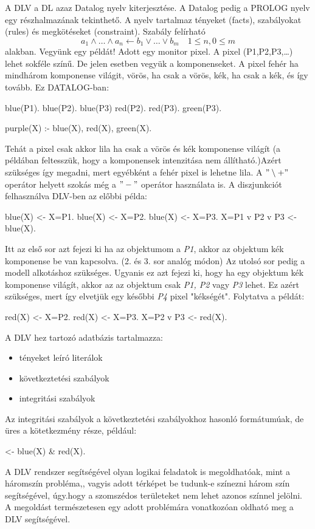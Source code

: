 A DLV a DL azaz Datalog nyelv kiterjesztése. A Datalog pedig a PROLOG nyelv egy részhalmazának tekinthető. A nyelv tartalmaz tényeket (facts), szabályokat (rules) és megkötéseket (constraint). Szabály felírható $$a_1 \wedge \ldots \wedge a_n \leftarrow b_1\vee \ldots \vee b_m \quad 1\leq n, 0\leq m$$ alakban. 
Vegyünk egy  példát! Adott egy monitor pixel. A pixel (P1,P2,P3,\ldots) lehet sokféle színű. De jelen esetben vegyük a komponenseket. A pixel fehér ha mindhárom komponense világit, vörös, ha csak a vörös, kék, ha csak a kék, és így tovább.  
Ez DATALOG-ban:
\begin{cpp}
blue(P1).
blue(P2).
blue(P3)
red(P2).
red(P3).
green(P3).

purple(X) :- blue(X), red(X), \+ green(X).
\end{cpp}
Tehát a pixel csak akkor lila ha csak a vörös és kék komponense világít (a példában feltesszük, hogy a komponensek intenzitása nem állítható.)Azért szükséges így megadni, mert egyébként a fehér pixel is lehetne lila. A $"\setminus+"$ operátor helyett szokás még a $"-"$ operátor használata is.
A diszjunkciót felhasználva DLV-ben az előbbi példa:
\begin{cpp}
blue(X) <- X=P1.
blue(X) <- X=P2.
blue(X) <- X=P3.
X=P1 v P2 v P3 <-blue(X).
\end{cpp}
Itt az első sor azt fejezi ki ha az objektumom a \textsl{P1}, akkor az objektum kék komponense be van kapcsolva. (2. és 3. sor analóg módon) Az utolsó sor pedig a modell alkotáshoz szükséges. Ugyanis ez azt fejezi ki, hogy ha egy objektum kék komponense világít, akkor az az objektum csak \textit{P1, P2} vagy \textit{P3} lehet. Ez azért szükséges, mert így elvetjük egy későbbi \textsl{P4} pixel "kékségét".
Folytatva a példát:
\begin{cpp}
red(X) <- X=P2.
red(X) <- X=P3.
X=P2 v P3 <- red(X).
\end{cpp}
A DLV hez tartozó adatbázis tartalmazza:
\begin{itemize}
\item tényeket leíró literálok
\item következtetési szabályok
\item integritási szabályok
\end{itemize}
Az integritási szabályok a következtetési szabályokhoz hasonló formátumúak, de üres a kötetkezmény része, például:
\begin{cpp}
<- blue(X) & red(X).
\end{cpp}
A DLV rendszer segítségével olyan  logikai  feladatok is megoldhatóak, mint a háromszín probléma,, vagyis adott térképet be tudunk-e színezni három szín segítségével, úgy.hogy a szomszédos területeket nem lehet azonos színnel jelölni. A megoldást természetesen egy adott problémára vonatkozóan oldható meg a DLV segítségével.\\
